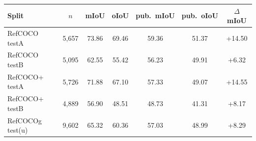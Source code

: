 \begin{tabular}{lcccccc}
\toprule
Split & $n$ & mIoU & oIoU & pub.\ mIoU & pub.\ oIoU & $\Delta$mIoU \\
\midrule
RefCOCO testA & 5,657 & 73.86 & 69.46 & 59.36 & 51.37 & +14.50 \\
RefCOCO testB & 5,095 & 62.55 & 55.42 & 56.23 & 49.91 & +6.32 \\
RefCOCO+ testA & 5,726 & 71.88 & 67.10 & 57.33 & 49.07 & +14.55 \\
RefCOCO+ testB & 4,889 & 56.90 & 48.51 & 48.73 & 41.31 & +8.17 \\
RefCOCOg test(u) & 9,602 & 65.32 & 60.36 & 57.03 & 48.99 & +8.29 \\
\bottomrule
\end{tabular}
